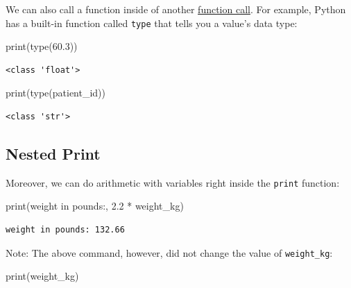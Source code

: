 \documentclass[
  letterpaper,
  DIV=11,
  numbers=noendperiod]{scrartcl}
\newenvironment{Shaded}{\begin{snugshade}}{\end{snugshade}}
\newcommand{\BuiltInTok}[1]{\textcolor[rgb]{0.00,0.23,0.31}{#1}}
\newcommand{\FloatTok}[1]{\textcolor[rgb]{0.68,0.00,0.00}{#1}}
\newcommand{\NormalTok}[1]{\textcolor[rgb]{0.00,0.23,0.31}{#1}}
\newcommand{\OperatorTok}[1]{\textcolor[rgb]{0.37,0.37,0.37}{#1}}
\newcommand{\StringTok}[1]{\textcolor[rgb]{0.13,0.47,0.30}{#1}}
\begin{document}
We can also call a function inside of another
\href{../learners/reference.md\#function-call}{function call}. For
example, Python has a built-in function called \texttt{type} that tells
you a value's data type:

\begin{Shaded}
\begin{Highlighting}[]
\BuiltInTok{print}\NormalTok{(}\BuiltInTok{type}\NormalTok{(}\FloatTok{60.3}\NormalTok{))}
\end{Highlighting}
\end{Shaded}

\begin{verbatim}
<class 'float'>
\end{verbatim}

\begin{Shaded}
\begin{Highlighting}[]
\BuiltInTok{print}\NormalTok{(}\BuiltInTok{type}\NormalTok{(patient\_id))}
\end{Highlighting}
\end{Shaded}

\begin{verbatim}
<class 'str'>
\end{verbatim}

\subsection{Nested Print}\label{nested-print}

Moreover, we can do arithmetic with variables right inside the
\texttt{print} function:

\begin{Shaded}
\begin{Highlighting}[]
\BuiltInTok{print}\NormalTok{(}\StringTok{\textquotesingle{}weight in pounds:\textquotesingle{}}\NormalTok{, }\FloatTok{2.2} \OperatorTok{*}\NormalTok{ weight\_kg)}
\end{Highlighting}
\end{Shaded}

\begin{verbatim}
weight in pounds: 132.66
\end{verbatim}

Note: The above command, however, did not change the value of
\texttt{weight\_kg}:

\begin{Shaded}
\begin{Highlighting}[]
\BuiltInTok{print}\NormalTok{(weight\_kg)}
\end{Highlighting}
\end{Shaded}
\end{document}
